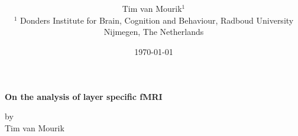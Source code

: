 \documentclass[twoside,openright,11pt,fleqn]{book}
\title{\vspace{-15mm}\fontsize{24pt}{10pt}\selectfont\textbf{}} %
\author{
\large
{Tim van Mourik$^1$}\\[2mm] %
\small $^1$ Donders Institute for Brain, Cognition and Behaviour, Radboud University Nijmegen, The Netherlands\\ %
\vspace{-5mm}
}
\date{\today}
\begin{document}
\setlength{\parindent}{0.5cm}
\renewcommand{\vec}[1]{\mathbf{#1}} %

\begin{titlepage}
	\centering
	\vspace{1cm}
	\vspace{1.5cm}
	{\huge\bfseries On the analysis of layer specific fMRI \par	%
	}
	\vspace{4cm}
	{\Large by \\ Tim van Mourik\par}
	\vfill
\end{titlepage}


%
%
%
%
%
%
\end{document}

